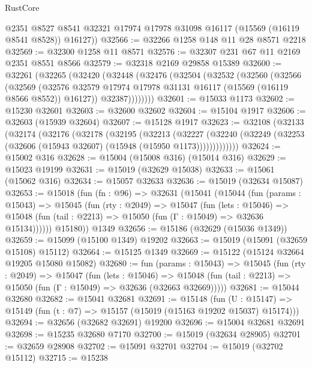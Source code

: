 \begin{lexlean}{RustCore}
\begin{coremodule}
        @2351
        @8527
        @8541
        @32321
        @17974
        @17978
        @31098
        @16117
        (@15569 (@16119 @8541 @8528))
        @16127))
@32566 := @32266 @1258 @148 @11 @28 @8571 @2218
@32569 := @32300 @1258 @11 @8571
@32576 := @32307 @231 @67 @11 @2169 @2351 @8551 @8566
@32579 := @32318 @2169 @29858 @15389
@32600 := @32261
    (@32265
      (@32420
        (@32448
          (@32476
            (@32504
              (@32532
                (@32560
                  (@32566
                    (@32569
                      (@32576
                        @32579
                        @17974
                        @17978
                        @31131
                        @16117
                        (@15569 (@16119 @8566 @8552))
                        @16127))
                    @32387))))))))
@32601 := @15033 @1173
@32602 := @15230 @32601
@32603 := @32600 @32602
@32604 := @15104 @1917
@32606 := @32603 (@15939 @32604)
@32607 := @15128 @1917
@32623 := @32108
    (@32133
      (@32174
        (@32176
          (@32178
            (@32195
              (@32213
                (@32227
                  (@32240 (@32249 (@32253 (@32606 (@15943 @32607) (@15948 (@15950 @1173)))))))))))))
@32624 := @15002 @316
@32628 := @15004 (@15008 @316) (@15014 @316)
@32629 := @15023 @19199
@32631 := @15019 (@32629 @15038)
@32633 := @15061 (@15062 @316)
@32634 := @15057 @32633
@32636 := @15019 (@32634 @15087)
@32653 := @15018
    (fun (fn : @96) =>
    @32631
      (@15041
        (@15044
          (fun (params : @15043) =>
          @15045
            (fun (rty : @2049) =>
            @15047
              (fun (lets : @15046) =>
              @15048 (fun (tail : @2213) => @15050 (fun (Γ : @15049) => @32636 @15134))))))
        @15180))
    @1349
@32656 := @15186 (@32629 (@15036 @1349))
@32659 := @15099 (@15100 @1349) @19202
@32663 := @15019 (@15091 (@32659 @15108) @15112)
@32664 := @15125 @1349
@32669 := @15122 (@15124 @32664 @19205 @15080 @15082)
@32680 := fun (params : @15043) =>
  @15045
    (fun (rty : @2049) =>
    @15047
      (fun (lets : @15046) =>
      @15048 (fun (tail : @2213) => @15050 (fun (Γ : @15049) => @32636 (@32663 @32669)))))
@32681 := @15044 @32680
@32682 := @15041 @32681
@32691 := @15148
    (fun (U : @15147) => @15149 (fun (t : @7) => @15157 (@15019 (@15163 @19202 @15037) @15174)))
@32694 := @32656 (@32682 @32691) @19200
@32696 := @15004 @32681 @32691
@32698 := @15235 @32680 @7170
@32700 := @15019 (@32634 @28905)
@32701 := @32659 @28908
@32702 := @15091 @32701
@32704 := @15019 (@32702 @15112)
@32715 := @15238

\end{coremodule}
\end{lexlean}
